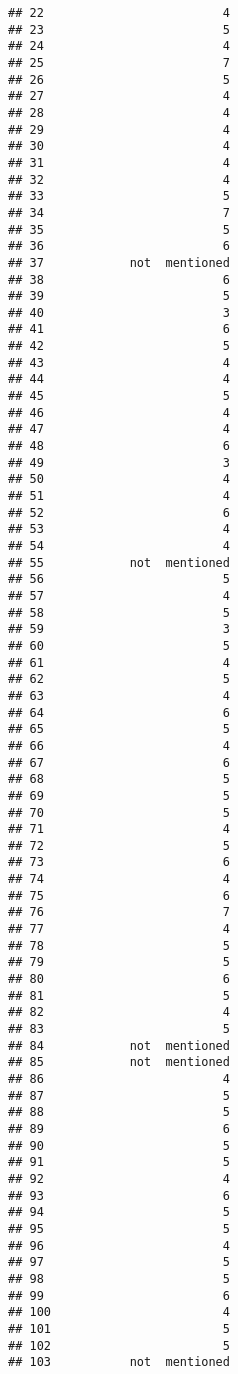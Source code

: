 \documentclass[
]{article}
\begin{document}
\begin{verbatim}
## 22                         4
## 23                         5
## 24                         4
## 25                         7
## 26                         5
## 27                         4
## 28                         4
## 29                         4
## 30                         4
## 31                         4
## 32                         4
## 33                         5
## 34                         7
## 35                         5
## 36                         6
## 37            not  mentioned
## 38                         6
## 39                         5
## 40                         3
## 41                         6
## 42                         5
## 43                         4
## 44                         4
## 45                         5
## 46                         4
## 47                         4
## 48                         6
## 49                         3
## 50                         4
## 51                         4
## 52                         6
## 53                         4
## 54                         4
## 55            not  mentioned
## 56                         5
## 57                         4
## 58                         5
## 59                         3
## 60                         5
## 61                         4
## 62                         5
## 63                         4
## 64                         6
## 65                         5
## 66                         4
## 67                         6
## 68                         5
## 69                         5
## 70                         5
## 71                         4
## 72                         5
## 73                         6
## 74                         4
## 75                         6
## 76                         7
## 77                         4
## 78                         5
## 79                         5
## 80                         6
## 81                         5
## 82                         4
## 83                         5
## 84            not  mentioned
## 85            not  mentioned
## 86                         4
## 87                         5
## 88                         5
## 89                         6
## 90                         5
## 91                         5
## 92                         4
## 93                         6
## 94                         5
## 95                         5
## 96                         4
## 97                         5
## 98                         5
## 99                         6
## 100                        4
## 101                        5
## 102                        5
## 103           not  mentioned

\end{verbatim}
\end{document}
